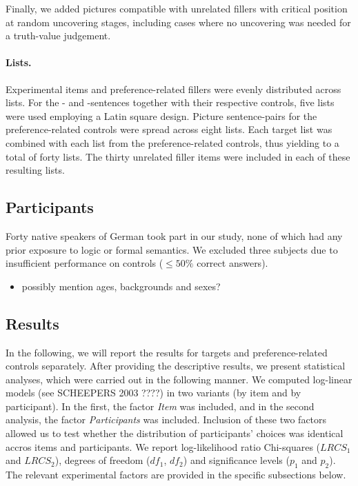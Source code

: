\documentclass[fleqn,reqno,10pt,draft]{article}
\newcommand{\as}{\acro{as}}
\renewcommand{\es}{\acro{es}}
\begin{document}
Finally, we added pictures compatible with unrelated fillers with
critical position at random uncovering stages, including cases where
no uncovering was needed for a truth-value judgement.

\paragraph{Lists.}
Experimental items and preference-related fillers were evenly
distributed across lists. For the \as- and \es-sentences together with
their respective controls, five lists were used employing a Latin
square design. Picture sentence-pairs for the preference-related
controls were spread across eight lists. Each target list was combined
with each list from the preference-related controls, thus yielding to
a total of forty lists. The thirty unrelated filler items were
included in each of these resulting lists.


\subsection{Participants}
\label{sec:participants} 

Forty native speakers of German took part in our study, none of which had
any prior exposure to logic or formal semantics. We excluded three
subjects due to insufficient performance on controls ($\le 50\%$
correct answers). 

\begin{itemize}
\item possibly mention ages, backgrounds and sexes?
\end{itemize}


\subsection{Results}
\label{sec:results}

In the following, we will report the results for targets and
preference-related controls separately. After providing the
descriptive results, we present statistical analyses, which were
carried out in the following manner.  We computed log-linear models
(see SCHEEPERS 2003 ????) in two variants (by item and by participant). In
the first, the factor {\it Item} was included, and in the second
analysis, the factor {\it Participants} was included. Inclusion of
these two factors allowed us to test whether the distribution of
participants' choices was identical accros items and participants. We
report log-likelihood ratio Chi-squares ($LRCS_1$ and $LRCS_2$),
degrees of freedom ($df_1$, $df_2$) and significance levels ($p_1$ and
$p_2$). The relevant experimental factors are provided in the specific
subsections below.
\end{document}
